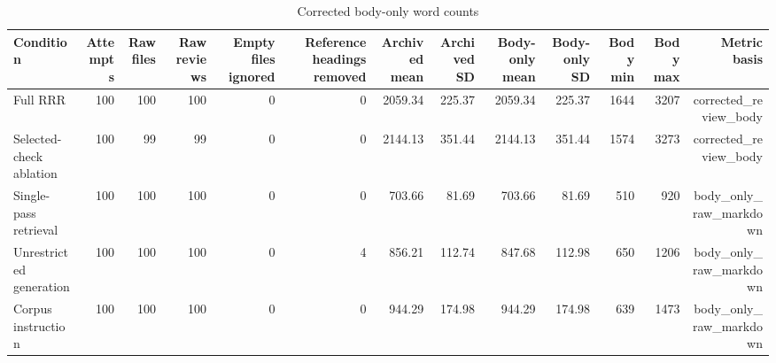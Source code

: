 \begin{table}[ht]
\centering
\caption{Corrected body-only word counts}
\scriptsize
\begin{tabular}{lrrrrrrrrrrrr}
\toprule
Condition & Attempts & Raw files & Raw reviews & Empty files ignored & Reference headings removed & Archived mean & Archived SD & Body-only mean & Body-only SD & Body min & Body max & Metric basis \\
\midrule
Full RRR & 100 & 100 & 100 & 0 & 0 & 2059.34 & 225.37 & 2059.34 & 225.37 & 1644 & 3207 & corrected\_review\_body \\
Selected-check ablation & 100 & 99 & 99 & 0 & 0 & 2144.13 & 351.44 & 2144.13 & 351.44 & 1574 & 3273 & corrected\_review\_body \\
Single-pass retrieval & 100 & 100 & 100 & 0 & 0 & 703.66 & 81.69 & 703.66 & 81.69 & 510 & 920 & body\_only\_raw\_markdown \\
Unrestricted generation & 100 & 100 & 100 & 0 & 4 & 856.21 & 112.74 & 847.68 & 112.98 & 650 & 1206 & body\_only\_raw\_markdown \\
Corpus instruction & 100 & 100 & 100 & 0 & 0 & 944.29 & 174.98 & 944.29 & 174.98 & 639 & 1473 & body\_only\_raw\_markdown \\
\bottomrule
\end{tabular}
\end{table}
